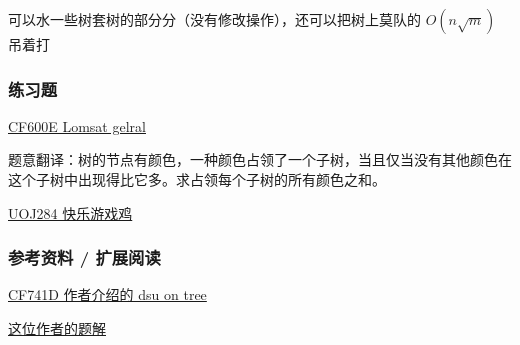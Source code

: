 可以水一些树套树的部分分（没有修改操作），还可以把树上莫队的 $O(n\sqrt{m})$ 吊着打

\subsubsection{练习题}

\href{http://codeforces.com/problemset/problem/600/E}{CF600E Lomsat gelral}

题意翻译：树的节点有颜色，一种颜色占领了一个子树，当且仅当没有其他颜色在这个子树中出现得比它多。求占领每个子树的所有颜色之和。

\href{http://uoj.ac/problem/284}{UOJ284 快乐游戏鸡}

\subsubsection{参考资料 / 扩展阅读}

\href{http://codeforces.com/blog/entry/44351}{CF741D 作者介绍的 dsu on tree}

\href{http://codeforces.com/blog/entry/48871}{这位作者的题解}
